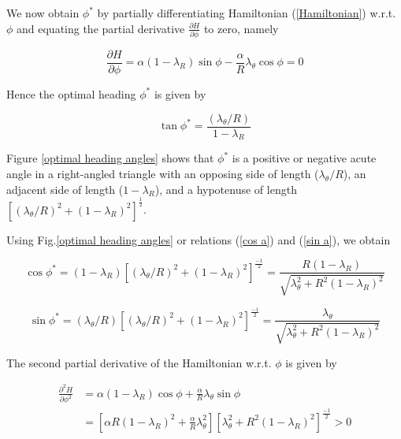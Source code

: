 We now obtain $\phi^*$ by partially differentiating Hamiltonian (\ref{Hamiltonian}) w.r.t. $\phi$ and equating the partial derivative $\frac{\partial H}{\partial \phi}$ to zero, namely 

\begin{equation} 
	\frac{\partial H}{\partial \phi} = \alpha (1-\lambda_R) \sin \phi - \frac{\alpha}{R} \lambda_\theta \cos \phi =0 
\label{PD H wrt phi}
\end{equation} 

Hence the optimal heading $\phi^*$ is given by 

\begin{equation}
	\tan \phi^* = \dfrac{(\lambda_\theta/R)}{1- \lambda_R}
\label{tan phi}
\end{equation}

Figure \ref{optimal heading angles} shows that $\phi^*$ is a positive or negative acute angle in a right-angled triangle with an opposing side of length ($\lambda_\theta/R$), an adjacent side of length ($1- \lambda_R$), and a hypotenuse of length $[(\lambda_\theta/R)^2+(1-\lambda_R)^2]^\frac{1}{2}$.

Using Fig.\ref{optimal heading angles} or relations (\ref{cos a}) and (\ref{sin a}), we obtain


\begin{equation}
	\cos \phi^* = (1-\lambda_R)[(\lambda_\theta/R)^2+(1-\lambda_R)^2]^\frac{-1}{2} 
	= \dfrac{R (1- \lambda_R)}{\sqrt{\lambda^2 _\theta + R^2 (1-\lambda_R)^2}}
\label{cos phi}
\end{equation}


\begin{equation}
\sin \phi^* = (\lambda_\theta /R)[(\lambda_\theta/R)^2+(1-\lambda_R)^2]^\frac{-1}{2} 
= \dfrac{\lambda_\theta}{\sqrt{\lambda^2 _\theta + R^2 (1-\lambda_R)^2}}
\label{sin phi}
\end{equation}

The second partial derivative of the Hamiltonian w.r.t. $\phi$ is given by 

\begin{equation}
\begin{split}
\frac{\partial^2 H}{\partial \phi^2}& = \alpha(1- \lambda_R)  \cos \phi +  \frac{\alpha }{R}\lambda_\theta \sin \phi \\
&= [\alpha R (1-\lambda_R)^2 +\frac{\alpha}{R} \lambda^2 _ \theta  ][\lambda^2_\theta + R^2 (1-\lambda_R)^2]^\frac{-1}{2} > 0
\end{split}
\end{equation}

